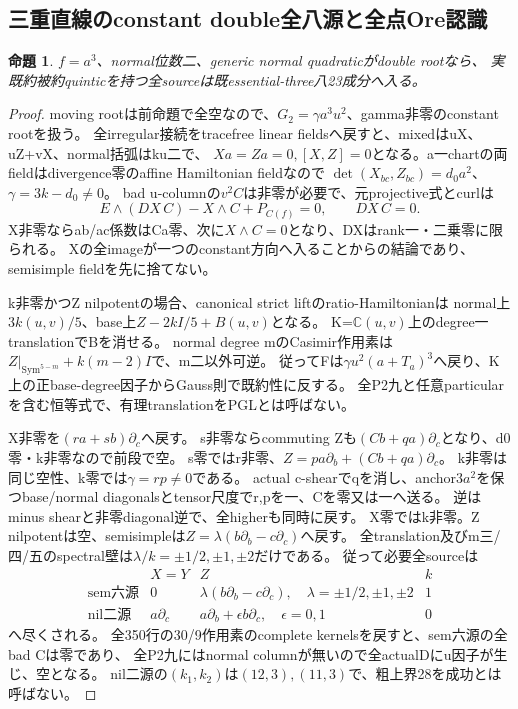 \documentclass[a4paper,11pt]{ltjsarticle}
\newtheorem{proposition}{命題}[section]
\theoremstyle{definition}
\begin{document}
\subsection{三重直線のconstant double全八源と全点Ore認識}
\begin{proposition}\label{prop:plane-triple-line-m2-double-eight-E}
$f=a^3$、normal位数二、generic normal quadraticがdouble rootなら、
実既約被約quinticを持つ全sourceは既essential-three八23成分へ入る。
\end{proposition}
\begin{proof}
moving rootは前命題で全空なので、$G_2=\gamma a^3u^2$、gamma非零のconstant rootを扱う。
全irregular接続をtracefree linear fieldsへ戻すと、mixedはuX、uZ+vX、normal括弧はku二で、
$Xa=Za=0,[X,Z]=0$となる。a一chartの両fieldはdivergence零のaffine Hamiltonian fieldなので
$\det(X_{bc},Z_{bc})=d_0a^2$、$\gamma=3k-d_0\ne0$。
bad u-columnの$v^2C$は非零が必要で、元projective式とcurlは
\[
 E\wedge(DX\,C)-X\wedge C+P_{C(f)}=0,\qquad DX\,C=0.
\]
X非零ならab/ac係数はCa零、次に$X\wedge C=0$となり、DXはrank一・二乗零に限られる。
Xの全imageが一つのconstant方向へ入ることからの結論であり、semisimple fieldを先に捨てない。

k非零かつZ nilpotentの場合、canonical strict liftのratio-Hamiltonianは
normal上$3k(u,v)/5$、base上$Z-2kI/5+B(u,v)$となる。
K=$\mathbb C(u,v)$上のdegree一translationでBを消せる。
normal degree mのCasimir作用素は$Z|_{\operatorname{Sym}^{5-m}}+k(m-2)I$で、m二以外可逆。
従ってFは$\gamma u^2(a+T_a)^3$へ戻り、K上の正base-degree因子からGauss則で既約性に反する。
全P2九と任意particularを含む恒等式で、有理translationをPGLとは呼ばない。

X非零を$(ra+sb)\partial_c$へ戻す。
s非零ならcommuting Zも$(Cb+qa)\partial_c$となり、d0零・k非零なので前段で空。
s零ではr非零、$Z=pa\partial_b+(Cb+qa)\partial_c$。
k非零は同じ空性、k零では$\gamma=rp\ne0$である。
actual c-shearでqを消し、anchor$3a^2$を保つbase/normal diagonalsとtensor尺度でr,pを一、Cを零又は一へ送る。
逆はminus shearと非零diagonal逆で、全higherも同時に戻す。
X零ではk非零。Z nilpotentは空、semisimpleは$Z=\lambda(b\partial_b-c\partial_c)$へ戻す。
全translation及びm三/四/五のspectral壁は$\lambda/k=\pm1/2,\pm1,\pm2$だけである。
従って必要全sourceは
\[
\begin{array}{c|c|c|c}
 &X=Y&Z&k\\\hline
 \text{sem六源}&0&\lambda(b\partial_b-c\partial_c),\quad\lambda=\pm1/2,\pm1,\pm2&1\\
 \text{nil二源}&a\partial_c&a\partial_b+\epsilon b\partial_c,\quad\epsilon=0,1&0
\end{array}
\]
へ尽くされる。
全350行の30/9作用素のcomplete kernelsを戻すと、sem六源の全bad Cは零であり、
全P2九にはnormal columnが無いので全actualDにu因子が生じ、空となる。
nil二源の$(k_1,k_2)$は$(12,3),(11,3)$で、粗上界28を成功とは呼ばない。


\end{proof}
\end{document}
